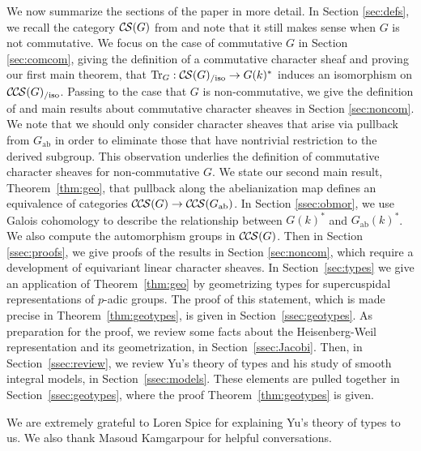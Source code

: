 \documentclass[10pt]{amsart}
\theoremstyle{plain}
\theoremstyle{definition}
\newcommand{\Fq}{k}
\DeclareMathOperator{\trace}{Tr}
\newcommand{\ab}{_{\operatorname{ab}}}
\newcommand{\trFrob}[1]{t_{#1}}
\DeclareMathOperator{\Tr}{Tr}
\newcommand{\TrFrob}[1]{\Tr_{#1}}
\newcommand{\cs}[1]{{\mathcal{#1}}}
\newcommand{\CS}{{\mathcal{C\hskip-0.8pt S}}}
\newcommand{\CCS}{{\mathcal{C\hskip-.8pt C\hskip-0.8pt S}}}
\newcommand{\CSiso}[1]{\CS(#1)_{/\text{iso}}}
\newcommand{\CCSiso}[1]{\CCS(#1)_{/\text{iso}}}
\begin{document}
We now summarize the sections of the paper in more detail.
%
In Section \ref{sec:defs}, we recall the category $\CS(G)$ from \cite{cunningham-roe:13a} and note that it still makes sense when $G$ is not commutative.  
%
We focus on the case of commutative $G$ in Section \ref{sec:comcom},
giving the definition of a commutative character sheaf and proving our first main theorem, that
$\TrFrob{G} : \CSiso{G} \to G(k)^*$ induces an isomorphism on $\CCSiso{G}$.
%
Passing to the case that $G$ is non-commutative, we give the definition of and main results about commutative character sheaves in Section \ref{sec:noncom}.  
We note that we should only consider character sheaves that arise via pullback from $G\ab$ in order to eliminate those that have nontrivial restriction to the derived subgroup.  
This observation underlies the definition of commutative character sheaves for non-commutative $G$.  
We state our second main result, Theorem~\ref{thm:geo}, that pullback along the abelianization map defines an equivalence of categories $\CCS(G) \to \CCS(G\ab)$.
In Section \ref{ssec:obmor}, we use Galois cohomology to describe the relationship between $G(k)^*$ and $G\ab(k)^*$.  
We also compute the automorphism groups in $\CCS(G)$.
Then in Section \ref{ssec:proofs}, we give proofs of the results in Section \ref{sec:noncom}, which require a development of equivariant linear character sheaves. 
% 
In Section~\ref{sec:types} we give an application of Theorem~\ref{thm:geo} by geometrizing types for supercuspidal representations of $p$-adic groups. The proof of this statement, which is made precise in Theorem~\ref{thm:geotypes}, is given in Section~\ref{ssec:geotypes}. 
As preparation for the proof, we review some facts about the Heisenberg-Weil representation and its geometrization, in Section~\ref{ssec:Jacobi}.
Then, in Section~\ref{ssec:review}, we review Yu's theory of types and his study of smooth integral models, in Section~\ref{ssec:models}.  
These elements are pulled together in Section~\ref{ssec:geotypes}, where the proof Theorem~\ref{thm:geotypes} is given.

\bigskip

We are extremely grateful to Loren Spice for explaining Yu's theory of types to us.
We also thank Masoud Kamgarpour for helpful conversations.
\end{document}
